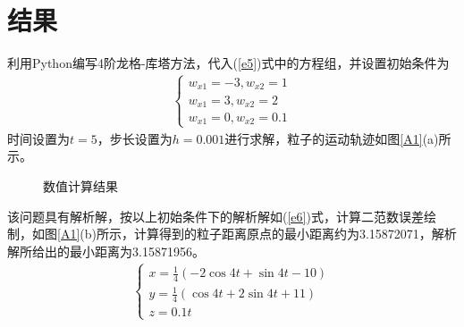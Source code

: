\documentclass{article} %
\begin{document}
\section{结果}
利用Python编写4阶龙格-库塔方法，代入(\ref{e5})式中的方程组，并设置初始条件为
\begin{align*}
  \begin{cases}
    w_{x1}=-3,w_{x2}=1\\
    w_{x1}=3,w_{x2}=2\\
    w_{x1}=0,w_{x2}=0.1
  \end{cases}
\end{align*}
时间设置为$t=5$，步长设置为$h=0.001$进行求解，粒子的运动轨迹如图\ref{A1}(a)所示。
\begin{figure}[h]
  \centering
  \caption{数值计算结果}
  \label{P1}
\end{figure}
该问题具有解析解，按以上初始条件下的解析解如(\ref{e6})式，计算二范数误差绘制，如图\ref{A1}(b)所示，计算得到的粒子距离原点的最小距离约为3.15872071，解析解所给出的最小距离为3.15871956。
\begin{align}
  \begin{cases}
    x=\frac{1}{4}(-2\cos{4t}+\sin{4t}-10)\\
    y=\frac{1}{4}(\cos{4t}+2\sin{4t}+11)\\
    z=0.1t
  \end{cases}
  \label{e6}
\end{align}
\end{document}

